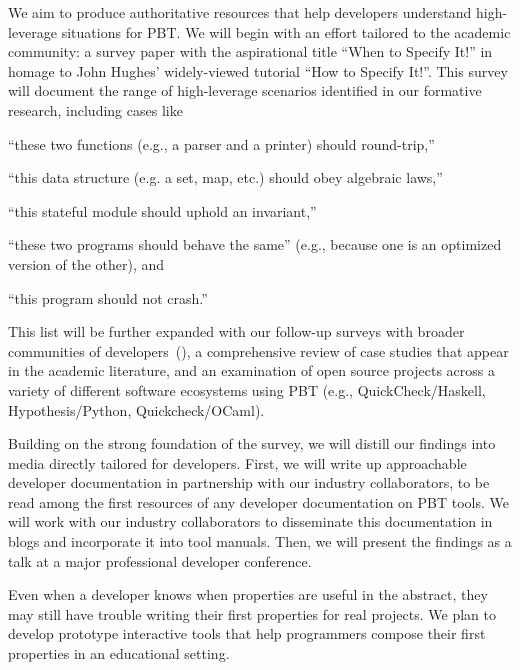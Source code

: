 We aim to produce authoritative resources that help developers understand
high-leverage situations for PBT. We will begin with an effort
tailored to the academic community: a survey paper with the
aspirational title ``When to Specify It!'' in homage to John Hughes'
widely-viewed tutorial ``How to Specify It!''. This survey will
document the range of high-leverage scenarios identified in our formative
research, including cases like
\begin{enumerate*}[label=(\arabic{enumi})]
\item ``these two functions (e.g., a parser and a printer) should round-trip,''
\item ``this data structure (e.g. a set, map, etc.) should obey algebraic laws,''
\item ``this stateful module should uphold an invariant,''
\item ``these two programs should behave the same'' (e.g., because one
is an optimized version of the other),
and
\item ``this program should not crash.''
\end{enumerate*}
This list will be further expanded with our follow-up surveys with broader
communities of developers~(), a comprehensive
review of case studies that appear in
the academic literature, and an examination of open source projects across a
variety of different software ecosystems using PBT (e.g.,
QuickCheck/Haskell, Hypothesis/Python, Quickcheck/OCaml).

Building on the strong foundation of the survey, we will distill our findings
into media directly tailored for developers. First, we will write up
approachable developer documentation in partnership with our industry
collaborators, to be read among the first resources of any developer
documentation on PBT tools. We will work with our industry collaborators to
disseminate this documentation in blogs and incorporate it into tool
manuals. Then, we will present the findings as a talk at a
major professional developer conference.

%
Even when a developer knows when properties are useful in the abstract,
they may still have trouble writing their first properties
for real projects. We plan to develop prototype interactive tools that help
programmers compose their first properties in an educational setting.

